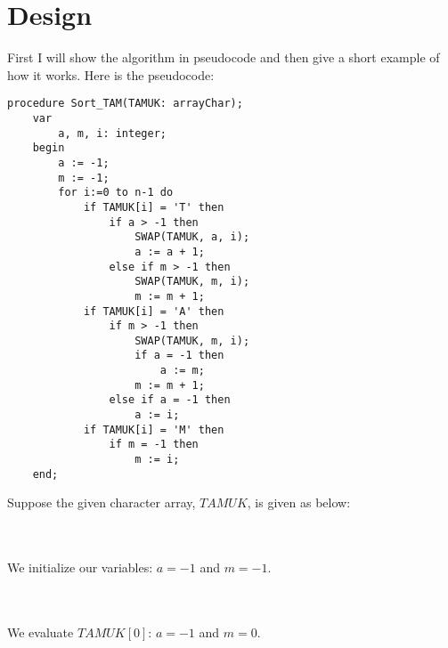 \documentclass[12pt]{report}
\begin{document}
\chapter{Design}
\label{chapter:design}
First I will show the algorithm in pseudocode and then give a short example of how it works.
Here is the pseudocode:
\begin{verbatim}
procedure Sort_TAM(TAMUK: arrayChar);
    var
        a, m, i: integer;
    begin
        a := -1;
        m := -1;
        for i:=0 to n-1 do
            if TAMUK[i] = 'T' then
                if a > -1 then
                    SWAP(TAMUK, a, i);
                    a := a + 1;
                else if m > -1 then
                    SWAP(TAMUK, m, i);
                    m := m + 1;
            if TAMUK[i] = 'A' then
                if m > -1 then
                    SWAP(TAMUK, m, i);
                    if a = -1 then
                        a := m;
                    m := m + 1;
                else if a = -1 then
                    a := i;
            if TAMUK[i] = 'M' then
                if m = -1 then
                    m := i;
    end;
\end{verbatim}
\pagebreak
Suppose the given character array, $TAMUK$, is given as below:\\\\
\\We initialize our variables: $a=-1$ and $m=-1$.\\\\
\\We evaluate $TAMUK[0]$: $a=-1$ and $m=0$.\\\\
\end{document}
